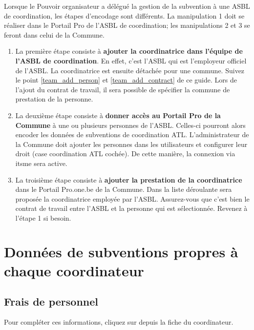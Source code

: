 \begin{tcolorbox}[title=Cas particulier: délégation de la subvention de coordination]
Lorsque le Pouvoir organisateur a délégué la gestion de la subvention à une ASBL de coordination, les étapes d'encodage sont différents. La manipulation 1 doit se réaliser dans le Portail Pro de l'ASBL de coordination; les manipulations 2 et 3 se feront dans celui de la Commune.




\begin{enumerate}
    \item La première étape consiste à \textbf{ajouter la coordinatrice dans l'équipe de l'ASBL de coordination}. En effet, c'est l'ASBL qui est l'employeur officiel de l'ASBL. La coordinatrice est ensuite détachée pour une commune. Suivez le point \ref{team_add_person} et \ref{team_add_contract} de ce guide. Lors de l'ajout du contrat de travail, il sera possible de spécifier la commune de prestation de la personne.
    \item La deuxième étape consiste à \textbf{donner accès au Portail Pro de la Commune} à une ou plusieurs personnes de l'ASBL. Celles-ci pourront alors encoder les données de subventions de coordination ATL. L'administrateur de la Commune doit ajouter les personnes dans les utilisateurs et configurer leur droit (case coordination ATL cochée). De cette manière, la connexion via itsme sera active.
    \item La troisième étape consiste à \textbf{ajouter la prestation de la coordinatrice} dans le Portail Pro.one.be de la Commune. Dans la liste déroulante sera proposée la coordinatrice employée par l'ASBL. Assurez-vous que c'est bien le contrat de travail entre l'ASBL et la personne qui est sélectionnée. Revenez à l'étape 1 si besoin.
\end{enumerate}
\end{tcolorbox}


\section{Données de subventions propres à chaque coordinateur}

\subsection{Frais de personnel}
Pour compléter ces informations, cliquez sur  depuis la fiche du coordinateur.


